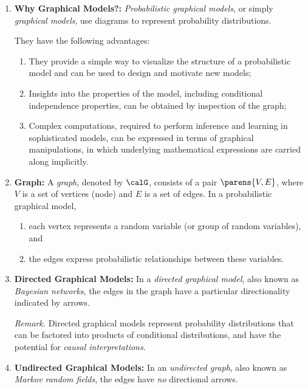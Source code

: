 \documentclass[12pt]{article}
\begin{document}
\begin{enumerate}[label=\textbf{\arabic*.}]

	\item \textbf{Why Graphical Models?:} \emph{Probabilistic graphical models}, or simply \emph{graphical models}, use diagrams to represent probability distributions. 
	
	They have the following advantages: 
	\begin{enumerate}
		\item They provide a simple way to visualize the structure of a probabilistic model and can be used to design and motivate new models; 
		\item Insights into the properties of the model, including conditional independence properties, can be obtained by inspection of the graph; 
		\item Complex computations, required to perform inference and learning in sophisticated models, can be expressed in terms of graphical manipulations, in which underlying mathematical expressions are carried along implicitly. 
	\end{enumerate}
	
	\item \textbf{Graph:} A \emph{graph}, denoted by $\calG$, consists of a pair $\parens{V, E}$, where $V$ is a set of vertices (node) and $E$ is a set of edges. In a probabilistic graphical model, 
	\begin{enumerate}
		\item each vertex represents a random variable (or group of random variables), and 
		\item the edges express probabilistic relationships between these variables. 
	\end{enumerate}
	
	\item \textbf{Directed Graphical Models:} In a \textit{directed graphical model}, also known as \textit{Bayesian networks}, the edges in the graph have a particular directionality indicated by arrows. 
	
	\textit{Remark.} Directed graphical models represent probability distributions that can be factored into products of conditional distributions, and have the potential for \textit{causal interpretations}. 
	
	\item \textbf{Undirected Graphical Models:} In an \textit{undirected graph}, also known as \emph{Markov random fields}, the edges have \emph{no} directional arrows. 
	

\end{enumerate}
\end{document}
